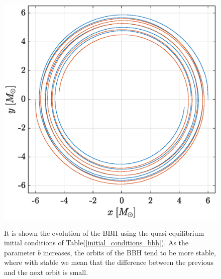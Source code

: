 \begin{figure}
   {\includegraphics[width=.45\textwidth]{numerical_evolution/trajectory_b6.eps}
   \label{trajectory_b6}} \quad
{} \quad
{} \quad
 \\
\caption{It is shown the evolution of the BBH using the quasi-equilibrium initial conditions of Table(\ref{initial_conditions_bbh}). As the parameter $b$ increases, the orbits of the BBH tend to be more stable, where with stable we mean that the difference between the previous and the next orbit is small.}
\label{orbits}
\end{figure}
